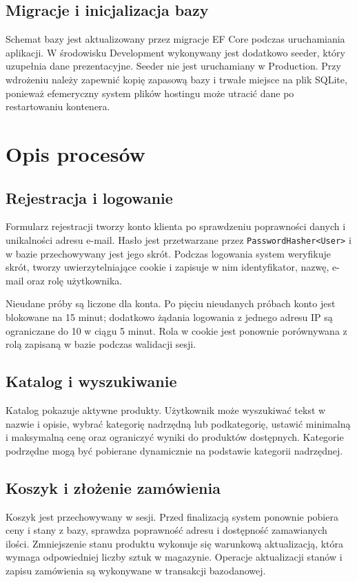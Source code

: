 \documentclass[12pt,a4paper]{article}
\begin{document}
\subsection{Migracje i inicjalizacja bazy}
Schemat bazy jest aktualizowany przez migracje EF Core podczas uruchamiania
aplikacji. W środowisku Development wykonywany jest dodatkowo seeder, który
uzupełnia dane prezentacyjne. Seeder nie jest uruchamiany w Production.
Przy wdrożeniu należy zapewnić kopię zapasową bazy i trwałe miejsce na plik
SQLite, ponieważ efemeryczny system plików hostingu może utracić dane po
restartowaniu kontenera.

\section{Opis procesów}

\subsection{Rejestracja i logowanie}
Formularz rejestracji tworzy konto klienta po sprawdzeniu poprawności danych
i unikalności adresu e-mail. Hasło jest przetwarzane przez
\texttt{PasswordHasher<User>} i w bazie przechowywany jest jego skrót.
Podczas logowania system weryfikuje skrót, tworzy uwierzytelniające cookie
i zapisuje w nim identyfikator, nazwę, e-mail oraz rolę użytkownika.

Nieudane próby są liczone dla konta. Po pięciu nieudanych próbach konto jest
blokowane na 15 minut; dodatkowo żądania logowania z jednego adresu IP są
ograniczane do 10 w ciągu 5 minut. Rola w cookie jest ponownie porównywana
z rolą zapisaną w bazie podczas walidacji sesji.

\subsection{Katalog i wyszukiwanie}
Katalog pokazuje aktywne produkty. Użytkownik może wyszukiwać tekst w nazwie
i opisie, wybrać kategorię nadrzędną lub podkategorię, ustawić minimalną
i maksymalną cenę oraz ograniczyć wyniki do produktów dostępnych. Kategorie
podrzędne mogą być pobierane dynamicznie na podstawie kategorii nadrzędnej.

\subsection{Koszyk i złożenie zamówienia}
Koszyk jest przechowywany w sesji. Przed finalizacją system ponownie pobiera
ceny i stany z bazy, sprawdza poprawność adresu i dostępność zamawianych ilości.
Zmniejszenie stanu produktu wykonuje się warunkową aktualizacją, która wymaga
odpowiedniej liczby sztuk w magazynie. Operacje aktualizacji stanów i zapisu
zamówienia są wykonywane w transakcji bazodanowej.
\end{document}
